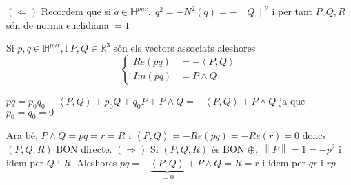 \documentclass[a4paper,12pt]{article}
\begin{document}
	\begin{demostracio}
		$\left(\Leftarrow\right)$ Recordem que si $q \in \mathbb{H}^{pur},\; q^2 = -N^2(q) = -\left\lVert Q \right\rVert^2$ i per tant $P,Q,R$ són de norma euclidiana $=1$
		\begin{lema}
			Si $p,q \in \mathbb{H}^{pur},\text{i}\; P,Q \in \mathbb{R}^3$ són els vectors associats aleshores
			\begin{displaymath}
				\begin{cases}
					Re\left(pq\right) &= -\left\langle P, Q \right\rangle\\
					Im\left(pq\right) &= P\wedge Q
				\end{cases}
			\end{displaymath}
		\end{lema}
		\begin{demostracio}
			$pq = p_0q_0 - \left\langle P, Q \right\rangle +p_0Q+q_0P + P\wedge Q = -\left\langle P, Q \right\rangle + P\wedge Q$ ja que $p_0 = q_0 = 0$
		\end{demostracio}
		Ara bé, $P\wedge Q = pq = r = R$ i $\left\langle P, Q \right\rangle = -Re(pq) = -Re(r) = 0$ doncs $\left(P,Q,R\right)$ BON directe.
		$\left(\Rightarrow\right)$ Si $\left(P,Q,R\right)$ és BON $\oplus,\; \left\lVert P \right\rVert = 1 = -p^2$ i idem per $Q$ i $R$. Aleshores $pq = - \underbrace{\left\langle P, Q \right\rangle}_{=0} + P\wedge Q = R = r$ i idem per $qr$ i $rp$.
	\end{demostracio}
\end{document}
